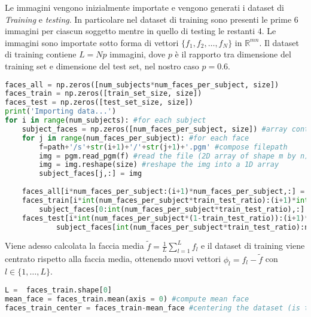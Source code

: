 Le immagini vengono inizialmente importate e vengono generati i dataset di \textit{Training} e \textit{testing}. In particolare nel dataset di training sono presenti le prime 6 immagini per ciascun soggetto mentre in quello di testing le restanti 4. Le immagini sono importate sotto forma di vettori \(\{f_1, f_2, \dots, f_N\}\) in \(\mathbb{R}^{mn}\). Il dataset di training contiene \(L = Np\) immagini, dove \(p\) è il rapporto tra dimensione del training set e dimensione del test set, nel nostro caso \(p = 0.6\).

\begin{lstlisting}[language=Python, caption= Data import]
faces_all = np.zeros([num_subjects*num_faces_per_subject, size])
faces_train = np.zeros([train_set_size, size])
faces_test = np.zeros([test_set_size, size])
print('Importing data...')
for i in range(num_subjects): #for each subject
    subject_faces = np.zeros([num_faces_per_subject, size]) #array containing all faces of the subject
    for j in range(num_faces_per_subject): #for each face
        f=path+'/s'+str(i+1)+'/'+str(j+1)+'.pgm' #compose filepath
        img = pgm.read_pgm(f) #read the file (2D array of shape m by n)
        img = img.reshape(size) #reshape the img into a 1D array
        subject_faces[j,:] = img 
    
    faces_all[i*num_faces_per_subject:(i+1)*num_faces_per_subject,:] = subject_faces
    faces_train[i*int(num_faces_per_subject*train_test_ratio):(i+1)*int(num_faces_per_subject*train_test_ratio),:] = \
        subject_faces[0:int(num_faces_per_subject*train_test_ratio),:]
    faces_test[i*int(num_faces_per_subject*(1-train_test_ratio)):(i+1)*int(num_faces_per_subject*(1-train_test_ratio)),:] = \
            subject_faces[int(num_faces_per_subject*train_test_ratio):num_faces_per_subject,:]
\end{lstlisting}

\noindent Viene adesso calcolata la faccia media \(\tilde{f} = \frac{1}{L}  \sum \limits_{l=1}^{L} f_l\) e il dataset di training viene centrato rispetto alla faccia media, ottenendo nuovi vettori \(\phi_l = f_l - \tilde{f}\) con \(l \in \{1, \dots, L\}\).

\begin{lstlisting}[language=Python, caption= Centering data]
L =  faces_train.shape[0]
mean_face = faces_train.mean(axis = 0) #compute mean face
faces_train_center = faces_train-mean_face #centering the dataset (is the matrix Phi^T)
\end{lstlisting}

